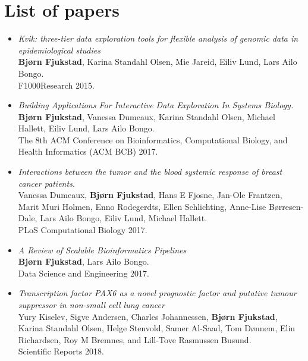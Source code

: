 \section{List of papers} 
\begin{itemize}
    \item
        \emph{Kvik: three-tier data exploration tools for flexible analysis of
        genomic data in epidemiological studies}
        \\
        \textbf{Bjørn Fjukstad}, Karina Standahl Olsen, Mie Jareid, Eiliv Lund,
        Lars Ailo Bongo. 
        \\ 
        F1000Research 2015.
        
    \item 
        \emph{Building Applications For Interactive Data Exploration In Systems
        Biology.}
        \\
        \textbf{Bjørn Fjukstad}, Vanessa Dumeaux, Karina Standahl Olsen, Michael
        Hallett, Eiliv Lund, Lars Ailo Bongo.  
        \\ 
        The 8th ACM Conference on Bioinformatics, Computational Biology, and
        Health Informatics (ACM BCB) 2017.

    \item 
        \emph{Interactions between the tumor and the blood systemic response of
        breast cancer patients.}
        \\ 
        Vanessa Dumeaux, \textbf{Bjørn Fjukstad}, Hans E Fjosne, Jan-Ole
        Frantzen, Marit Muri Holmen, Enno Rodegerdts, Ellen Schlichting,
        Anne-Lise Børresen-Dale, Lars Ailo Bongo, Eiliv Lund, Michael Hallett.
        \\ 
        PLoS Computational Biology 2017.

    \item \emph{A Review of Scalable Bioinformatics Pipelines} 
        \\
        \textbf{Bjørn Fjukstad}, Lars Ailo Bongo.
        \\ 
        Data Science and Engineering 2017.

    \item \emph{Transcription factor PAX6 as a novel prognostic factor and
        putative tumour suppressor in non-small cell lung cancer} 
        \\
        Yury Kiselev, Sigve Andersen, Charles Johannessen, \textbf{Bjørn
        Fjukstad}, Karina Standahl Olsen, Helge Stenvold, Samer Al-Saad, Tom
        Dønnem, Elin Richardsen, Roy M Bremnes, and Lill-Tove Rasmussen Busund. 
        \\
        Scientific Reports 2018. 


\end{itemize}
